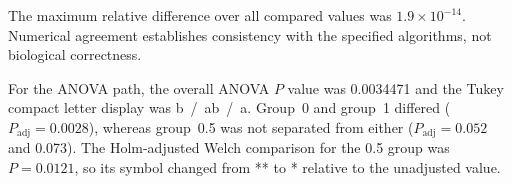 \documentclass[11pt,a4paper]{article}
\begin{document}
The maximum relative difference over all compared values was
$1.9 \times 10^{-14}$. Numerical agreement establishes consistency with the
specified algorithms, not biological correctness.

For the ANOVA path, the overall ANOVA $P$ value was 0.0034471 and the Tukey
compact letter display was b~/~ab~/~a. Group~0 and group~1 differed
($P_{\mathrm{adj}} = 0.0028$), whereas group~0.5 was not separated from either
($P_{\mathrm{adj}} = 0.052$ and 0.073). The Holm-adjusted Welch comparison for
the 0.5 group was $P = 0.0121$, so its symbol changed from ** to * relative to
the unadjusted value.
\end{document}
